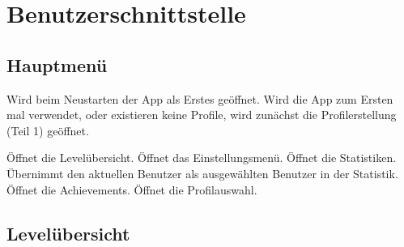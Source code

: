 \section{Benutzerschnittstelle}

\subsection{Hauptmenü}

\begin{center}
\setlength\fboxsep{20pt}
\setlength\fboxrule{1pt}
\end{center}

Wird beim Neustarten der App als Erstes geöffnet. Wird die App zum Ersten mal verwendet, oder existieren keine Profile, wird zunächst die Profilerstellung (Teil 1) geöffnet.
\begin{requirements}
 Öffnet die Levelübersicht.
 Öffnet das Einstellungsmenü.
 Öffnet die Statistiken. Übernimmt den aktuellen Benutzer als ausgewählten Benutzer in der Statistik.
 Öffnet die Achievements.
 Öffnet die Profilauswahl.
\end{requirements}

\subsection{Levelübersicht}

